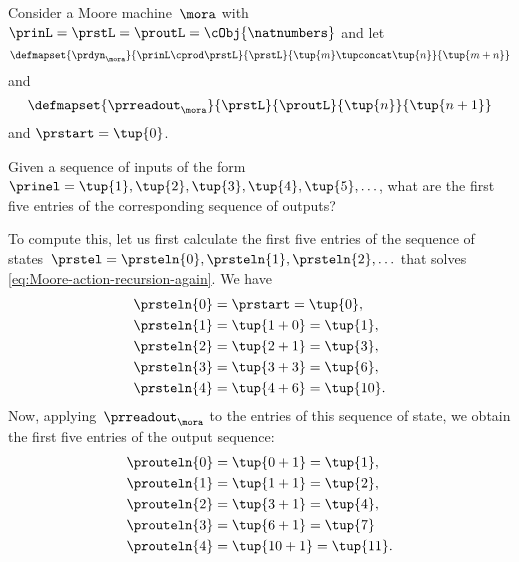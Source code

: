 \begin{example}
    \label{exa:moore-standard-action}
    Consider a Moore machine~$\mora$ with~$\prinL = \prstL = \proutL = \cObj{\natnumbers}$
    and let
    \begin{equation}
        \defmapset{
            \prdyn_\mora
        }{
            \prinL \cprod \prstL
        }{
            \prstL
        }{
            \tup{m} \tupconcat \tup{n}
        }{
            \tup{m + n}
        }
    \end{equation}
    and
    \begin{equation}
        \defmapset{
            \prreadout_\mora
        }{
            \prstL
        }{
            \proutL
        }{
            \tup{n}
        }{
            \tup{n+1}
        }
    \end{equation}
    and $\prstart = \tup{0}$.

    Given a sequence of inputs of the form~$\prinel = \tup{1}, \tup{2}, \tup{3}, \tup{4}, \tup{5}, \ldots$, what are the first five entries of the corresponding sequence of outputs?

    To compute this, let us first calculate the first five entries of the sequence of states~$\prstel = \prsteln{0}, \prsteln{1}, \prsteln{2}, \ldots$ that solves \cref{eq:Moore-action-recursion-again}.
    We have
    \begin{align*}
        \prsteln{0} & = \prstart = \tup{0}, \\
        \prsteln{1} & = \tup{1 + 0} = \tup{1}, \\
        \prsteln{2} & = \tup{2 + 1} = \tup{3}, \\
        \prsteln{3} & = \tup{3 + 3} = \tup{6}, \\
        \prsteln{4} & = \tup{4 + 6} = \tup{10}.
    \end{align*}
    Now, applying~$\prreadout_\mora$ to the entries of this sequence of state, we obtain the first five entries of the output sequence:
    \begin{align*}
        \prouteln{0} & = \tup{0 + 1} = \tup{1}, \\
        \prouteln{1} & = \tup{1 + 1} = \tup{2}, \\
        \prouteln{2} & = \tup{3 + 1} = \tup{4}, \\
        \prouteln{3} & = \tup{6 + 1} = \tup{7} \\
        \prouteln{4} & = \tup{10 + 1} = \tup{11}.
    \end{align*}
\end{example}

